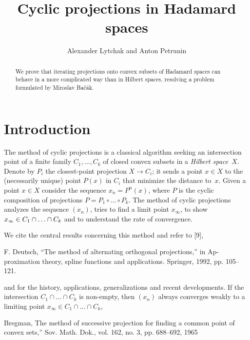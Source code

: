 \documentclass[a4paper,10pt]{article}
\def\thetitle{Cyclic projections in Hadamard spaces}
\def\theauthors{Alexander Lytchak and Anton Petrunin}
\begin{document}
\title{\thetitle}	
\author{\theauthors}
\date{}
\maketitle

\begin{abstract}
We  prove that iterating projections onto convex subsets of Hadamard spaces can behave in a more complicated way than in Hilbert spaces, resolving a problem formulated by Miroslav Bačák.
\end{abstract}


\section{Introduction}

The method of cyclic  projections is a classical algorithm seeking  an intersection point of a finite family  $C_1,\dots, C_k$ of  closed convex subsets in a \emph{Hilbert  space}~$X$.
Denote by $P_i$ the closest-point projection $X\to C_i$; it sends a point $x\in X$ to the (necessarily unique) point $P(x)$ in $C_i$ that minimize the distance to~$x$.
Given a point $x\in X$ consider the sequence $x_n=P^n(x)$, where
$P$ is the  cyclic composition of projections $P= P_1\circ \dots \circ P_k$.  The method of cyclic projections analyzes the sequence $(x_n)$, tries to find a limit point $x_{\infty}$, to show $x_{\infty} \in C_1\cap\z\dots\cap C_k$ and to understand the  rate of convergence.

We  cite the central results concerning this method and refer to [9],

 F. Deutsch, “The method of alternating orthogonal projections,” in Ap-
proximation theory, spline functions and applications. Springer, 1992,
pp. 105–121. 


and \cite{Bac, Bac2} for the history, applications, generalizations  and recent developments. If the intersection  $C_1\cap ...\cap C_k$ is non-empty, then $(x_n)$ always converges weakly to a limiting point $x_{\infty} \in  C_1\cap ...\cap C_k$,

Bregman,  The method of successive projection for finding a common point of convex sets,” Sov. Math. Dok., vol. 162, no. 3, pp. 688–692,
1965
\end{document}
